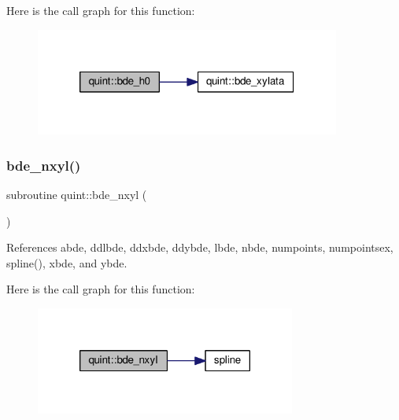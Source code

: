Here is the call graph for this function\+:
\nopagebreak
\begin{figure}[H]
\begin{center}
\leavevmode
\includegraphics[width=284pt]{namespacequint_aa2daf9edc78c79ba058ae4833682c9a8_cgraph}
\end{center}
\end{figure}
\mbox{\label{namespacequint_a90306420209b7de0bec2152dd1e024bb}} 
\subsubsection{\texorpdfstring{bde\+\_\+nxyl()}{bde\_nxyl()}}
{\footnotesize\ttfamily subroutine quint\+::bde\+\_\+nxyl (\begin{DoxyParamCaption}{ }\end{DoxyParamCaption})}



References abde, ddlbde, ddxbde, ddybde, lbde, nbde, numpoints, numpointsex, spline(), xbde, and ybde.

Here is the call graph for this function\+:
\nopagebreak
\begin{figure}[H]
\begin{center}
\leavevmode
\includegraphics[width=242pt]{namespacequint_a90306420209b7de0bec2152dd1e024bb_cgraph}
\end{center}
\end{figure}
\mbox{\label{namespacequint_ae1b7ac10a36d63310cbfe418b53b9684}} 

